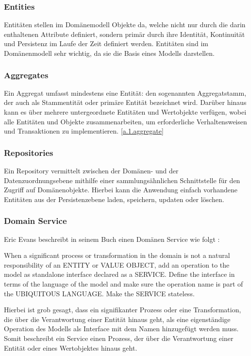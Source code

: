 			\subsubsection{Entities \cite{domainModell.microsoft}} \label{1.ent}
			Entitäten stellen im Domänemodell Objekte da, welche nicht nur durch die darin enthaltenen Attribute definiert, sondern primär durch ihre Identität, Kontinuität und Persistenz im Laufe der Zeit definiert werden. Entitäten sind im Domänenmodell sehr wichtig, da sie die Basis eines Modells darstellen.
			
			\subsubsection{Aggregates \cite{domainModell.microsoft}} \label{1.aggregates}
			Ein Aggregat umfasst mindestens eine Entität: den sogenannten Aggregatstamm, der auch als Stammentität oder primäre Entität bezeichnet wird. Darüber hinaus kann es über mehrere untergeordnete Entitäten und Wertobjekte verfügen, wobei alle Entitäten und Objekte zusammenarbeiten, um erforderliche Verhaltensweisen und Transaktionen zu implementieren. \cref{a.1.aggregate}
			
			\subsubsection{Repositories \cite{repository.medium}}
			Ein Repository vermittelt zwischen der Domänen- und der Datenzuordnungsebene mithilfe einer sammlungsähnlichen Schnittstelle für den Zugriff auf Domänenobjekte. Hierbei kann die Anwendung einfach vorhandene Entitäten aus der Persistenzebene laden, speichern, updaten oder löschen.
			
			\subsubsection{Domain Service \cite{domainService.gorodinski}}
			Eric Evans beschreibt in seinem Buch  einen Domänen Service wie folgt : 
			\begin{displayquote}
				When a significant process or transformation in the domain is not a natural responsibility of an ENTITY or VALUE OBJECT, add an operation to the model as standalone interface declared as a SERVICE. Define the interface in terms of the language of the model and make sure the operation name is part of the UBIQUITOUS LANGUAGE. Make the SERVICE stateless.
			\end{displayquote}
			Hierbei ist grob gesagt, dass ein signifikanter Prozess oder eine Transformation, die über die Verantwortung einer Entität hinaus geht, als eine eigenständige Operation des Modells als Interface mit dem Namen  hinzugefügt werden muss. Somit beschreibt ein Service einen Prozess, der über die Verantwortung einer Entität oder eines Wertobjektes hinaus geht.
		
